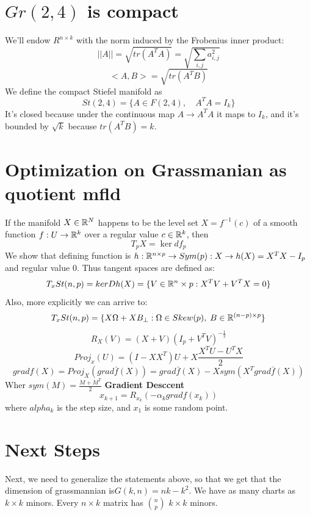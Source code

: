 \documentclass[11pt,a4paper]{report}
\begin{document}
\chapter{$Gr(2,4)$ is compact}
We'll endow $R^{n \times k} $ with the norm induced by the
Frobenius inner product:
$$ || A || = \sqrt{tr (A^T A)} = \sqrt{\sum_{i,j} a^2_{i,j}} $$
$$ <A,B> = \sqrt{tr(A^T B)} $$
We define the compact Stiefel manifold as
$$ St(2,4) = \{ A \in F(2,4), \quad  A^T A = I_k \}  $$
It's closed because under the continuous map $A \to A^T A$ it maps to $I_k$,
and it's bounded by $\sqrt{k}$ because $tr(A^TB)=k$.
\chapter{Optimization on Grassmanian as quotient mfld}
\begin{Def}
    If the manifold $X \in \mathbb{R}^N$ happens to be the level set $X = f^{-1} (c)$ of a smooth function
    $f: U \to \mathbb{R}^k$ over a regular value $c \in \mathbb{R}^k$, then 
    $$ T_p X = \ker d f_p $$
    We show that defining function is $h: \mathbb{R}^{n \times p} \to Sym(p): X \to h(X) = X^T X - I_p $ and regular value $0$.
    Thus tangent spaces are defined as:
    $$ T_x St(n,p) = ker Dh(X) = \{ V \in \mathbb{R}^n \times p : X^T V + V^T X = 0 \} $$
    Also, more explicitly we can arrive to:
    $$ T_x St(n,p) = \{ X \Omega + X B_{\bot} : \Omega \in Skew(p), \; B \in \mathbb{R}^{ (n-p)\times p} \} $$
    $$ R_X(V) = (X + V) (I_p + V^T V)^{-\frac{1}{2}}  $$
    $$Proj_x(U) = (I - X X^T) U + X \frac{X^T U - U^T X}{2} $$
    $$ grad f(X) = Proj_{X} (grad \bar{f}(X)) = grad \bar{f}(X) - X sym (X^T grad \bar{f}(X)) $$
    Wher $sym(M) = \frac{ M + M^T}{2} $
    \newline
    \textbf{Gradient Desccent}
    $$ x_{k+1} = R_{x_k}(-\alpha_k gradf(x_k))$$
    where $alpha_k$ is the step size, and $x_1$ is some random point.
\end{Def}
\chapter{Next Steps}
Next, we need to generalize the statements above, so that we get that the dimension of grassmannian is$ G(k,n) = n k-k^2$.
We have as many charts as $k \times k$ minors. Every $ n \times k$ matrix has ${n \choose p}$ $k\times k$ minors.


\setcounter{tocdepth}{1} 

 
\end{document}
